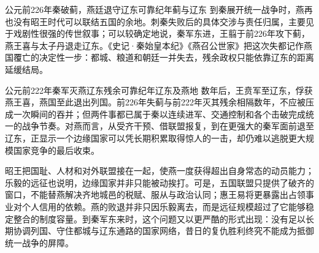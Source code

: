 \begin{event}{公元前226年}{秦破蓟，燕廷退守辽东}{可靠纪年}{蓟与辽东}
到秦展开统一战争时，燕再也没有昭王时代可以联结五国的余地。刺秦失败后的具体交涉与责任归属，主要见于戏剧性很强的传世叙事；可以较确定地说，秦军东进，王翦于前226年攻下蓟，燕王喜与太子丹退走辽东。《史记·秦始皇本纪》《燕召公世家》把这次失都记作燕国覆亡的决定性一步：都城、粮道和朝廷一并失去，残余政权只能依靠辽东的距离延缓结局。
\end{event}

\begin{event}{公元前222年}{秦军灭燕辽东残余}{可靠纪年}{辽东及燕地}
数年后，王贲军至辽东，俘获燕王喜，燕国至此退出列国。前226年失蓟与前222年灭其残余相隔数年，不应被压成一次瞬间的吞并；但两件事都已属于秦以连续进军、交通控制和各个击破完成统一的战争节奏。对燕而言，从受齐干预、借联盟报复，到在更强大的秦军面前退至辽东，正显示一个边缘国家可以凭长期积累取得惊人的一击，却仍难以逃脱更大规模国家竞争的最后收束。
\end{event}



\begin{turningpoint}
昭王把国耻、人材和对外联盟接在一起，使燕一度获得超出自身常态的动员能力；乐毅的远征也说明，边缘国家并非只能被动挨打。可是，五国联盟只提供了破齐的窗口，不能替燕解决齐地城邑的税赋、服从与政治认同；惠王易将更暴露出占领事业对个人信用的依赖。燕的败退并非只因乐毅离去，而是远征规模超过了它能够稳定整合的制度容量。到秦军东来时，这个问题又以更严酷的形式出现：没有足以长期协调列国、守住都城与辽东通路的国家网络，昔日的复仇胜利终究不能成为抵御统一战争的屏障。
\end{turningpoint}
